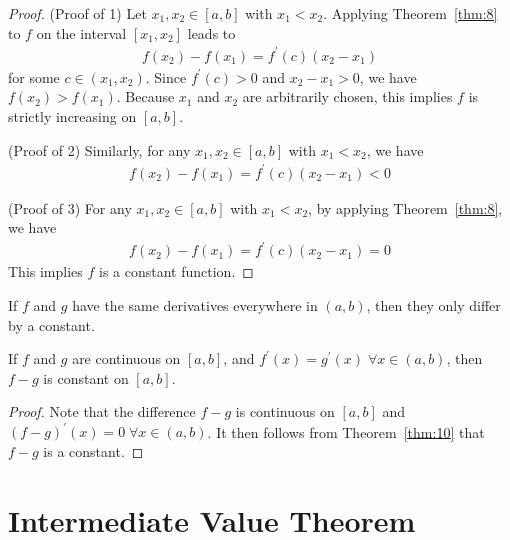 \documentclass[thmcnt=section, 12pt]{my-elegantbook}
\begin{document}
\begin{proof}
    (Proof of 1) Let $x_1, x_2 \in [a, b]$ with $x_1 < x_2$. Applying Theorem~\ref{thm:8} to $f$ on the interval $[x_1, x_2]$ leads to 
    \begin{align*}
        f(x_2) - f(x_1) = f^\prime(c) (x_2 - x_1)
    \end{align*}
    for some $c \in (x_1, x_2)$. Since $f^\prime(c) > 0$ and $x_2 - x_1 > 0$, we have $f(x_2) > f(x_1)$. Because $x_1$ and $x_2$ are arbitrarily chosen, this implies $f$ is strictly increasing on $[a, b]$.

    (Proof of 2) Similarly, for any $x_1, x_2 \in [a, b]$ with $x_1 < x_2$, we have 
    \begin{align*}
        f(x_2) - f(x_1) = f^\prime(c) (x_2 - x_1) < 0
    \end{align*}

    (Proof of 3) For any $x_1, x_2 \in [a, b]$ with $x_1 < x_2$, by applying Theorem~\ref{thm:8}, we have
    \begin{align*}
        f(x_2) - f(x_1) = f^\prime(c) (x_2 - x_1) = 0
    \end{align*}
    This implies $f$ is a constant function.
\end{proof}

\par If $f$ and $g$ have the same derivatives everywhere in $(a, b)$, then they only differ by a constant. 

\begin{corollary}
    If $f$ and $g$ are continuous on $[a, b]$, and $f^\prime(x) = g^\prime(x) \; \forall x \in (a, b)$, then $f - g$ is constant on $[a, b]$.
\end{corollary}

\begin{proof}
    Note that the difference $f-g$ is continuous on $[a, b]$ and $(f-g)^\prime(x) = 0 \; \forall x \in (a, b)$. It then follows from Theorem~\ref{thm:10} that $f-g$ is a constant.
\end{proof}


\section{Intermediate Value Theorem}
\end{document}
